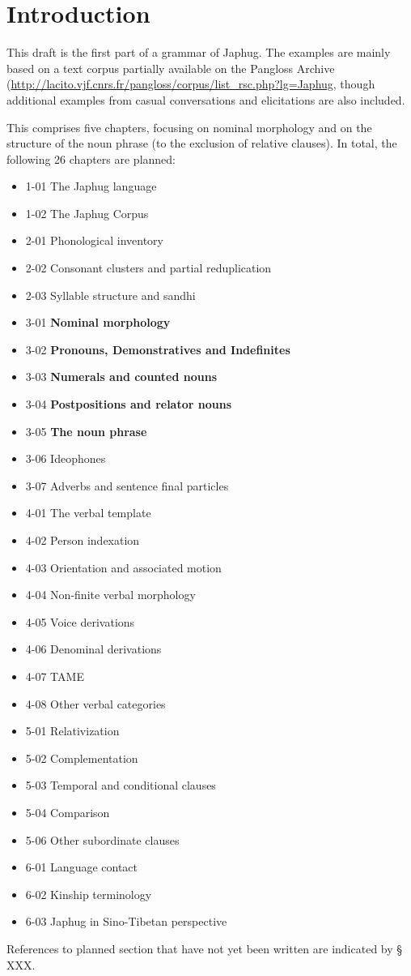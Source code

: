 \chapter*{Introduction}  
This draft is the first part of a grammar of Japhug. The examples are mainly based on a text corpus partially available on the Pangloss Archive (\url{http://lacito.vjf.cnrs.fr/pangloss/corpus/list\_rsc.php?lg=Japhug}, though additional examples from casual conversations and elicitations are also included.

This comprises five chapters, focusing on nominal morphology and on the structure of the noun phrase (to the exclusion of relative clauses). In total, the following 26 chapters are planned:

\begin{itemize}
\item 1-01 The Japhug language
\item 1-02 The Japhug Corpus
\item 2-01 Phonological inventory 
\item 2-02 Consonant clusters and partial reduplication
\item 2-03 Syllable structure and sandhi
\item 3-01 \textbf{Nominal morphology}
\item 3-02 \textbf{Pronouns, Demonstratives and Indefinites}
\item 3-03 \textbf{Numerals and counted nouns}
\item 3-04 \textbf{Postpositions and relator nouns}
\item 3-05 \textbf{The noun phrase}
\item 3-06 Ideophones
\item 3-07 Adverbs and sentence final particles
\item 4-01 The verbal template
\item 4-02 Person indexation
\item 4-03 Orientation and associated motion
\item 4-04 Non-finite verbal morphology
\item 4-05 Voice derivations
\item 4-06 Denominal derivations
\item 4-07 TAME
\item 4-08 Other verbal categories
\item 5-01 Relativization
\item 5-02 Complementation
\item 5-03 Temporal and conditional clauses
\item 5-04 Comparison
\item 5-06 Other subordinate clauses
\item 6-01 Language contact
\item 6-02 Kinship terminology
\item 6-03 Japhug in Sino-Tibetan perspective
\end{itemize}

 References to planned section that have not yet been written are indicated by § XXX.